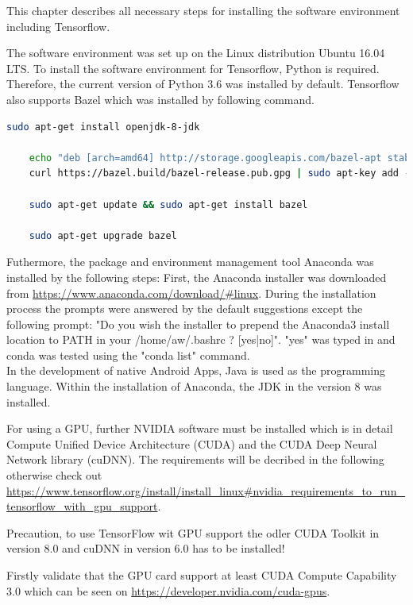 This chapter describes all necessary steps for installing the software environment including Tensorflow.

The software environment was set up on the Linux distribution Ubuntu 16.04 LTS. To install the software environment for Tensorflow, Python is required. Therefore, the current version of Python 3.6 was installed by default. Tensorflow also supports Bazel which was installed by following command.

\begin{lstlisting}[caption=Bazel Installation, label=list:bazel, language=bash]
	sudo apt-get install openjdk-8-jdk
	
	echo "deb [arch=amd64] http://storage.googleapis.com/bazel-apt stable jdk1.8" | sudo tee /etc/apt/				sources.list.d/bazel.list
	curl https://bazel.build/bazel-release.pub.gpg | sudo apt-key add -
	
	sudo apt-get update && sudo apt-get install bazel
	
	sudo apt-get upgrade bazel
\end{lstlisting}	

Futhermore, the package and environment management tool Anaconda was installed by the following steps:
First, the Anaconda installer was downloaded from \url{https://www.anaconda.com/download/#linux}. During the installation process the prompts were answered by the default suggestions except the following prompt: "Do you wish the installer to prepend the Anaconda3 install location to PATH in your /home/aw/.bashrc ? [yes|no]". "yes" was typed in and conda was tested using the "conda list" command. \\

In the development of native Android Apps, Java is used as the programming language. Within the installation of Anaconda, the JDK in the version 8 was installed.

For using a GPU, further NVIDIA software must be installed which is in detail Compute Unified Device Architecture (CUDA) and the CUDA Deep Neural Network library (cuDNN). The requirements will be decribed in the following otherwise check out \url{https://www.tensorflow.org/install/install_linux#nvidia_requirements_to_run_tensorflow_with_gpu_support}. 

Precaution, to use TensorFlow wit GPU support the odler CUDA Toolkit in version 8.0 and cuDNN in version 6.0 has to be installed!

Firstly validate that the GPU card support at least CUDA Compute Capability 3.0 which can be seen on \url{https://developer.nvidia.com/cuda-gpus}.

